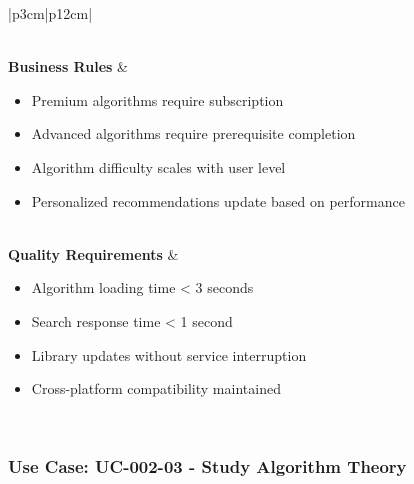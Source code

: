 \documentclass[12pt,a4paper]{article}
\begin{document}
\begin{longtable}{|p{3cm}|p{12cm}|}
\begin{minipage}[t]{\linewidth}
\begin{itemize}[leftmargin=*,noitemsep,topsep=0pt]
\end{itemize}
\end{minipage} \\
\hline
\textbf{Business Rules} & 
\begin{minipage}[t]{\linewidth}
\begin{itemize}[leftmargin=*,noitemsep,topsep=0pt]
    \item Premium algorithms require subscription
    \item Advanced algorithms require prerequisite completion
    \item Algorithm difficulty scales with user level
    \item Personalized recommendations update based on performance
\end{itemize}
\end{minipage} \\
\hline
\textbf{Quality Requirements} & 
\begin{minipage}[t]{\linewidth}
\begin{itemize}[leftmargin=*,noitemsep,topsep=0pt]
    \item Algorithm loading time < 3 seconds
    \item Search response time < 1 second
    \item Library updates without service interruption
    \item Cross-platform compatibility maintained
\end{itemize}
\end{minipage} \\
\hline
\end{longtable}

\subsubsection{Use Case: UC-002-03 - Study Algorithm Theory}
\end{document}
